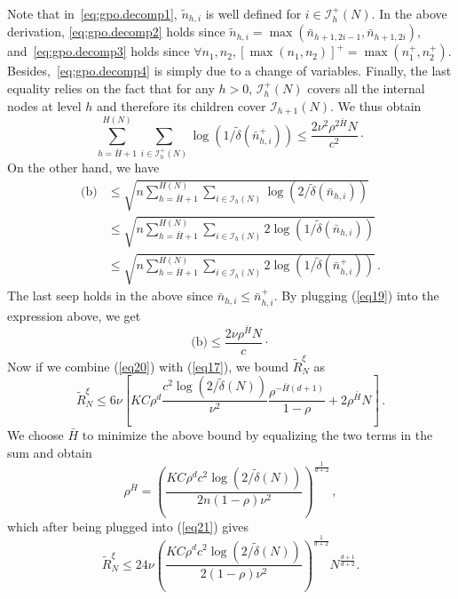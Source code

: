 \endgroup
Note that in~\eqref{eq:gpo.decomp1}, $\tilde{n}_{h,i}$ is well defined for $i\in\mathcal{I}_h^+(N)$. In the above derivation, \eqref{eq:gpo.decomp2} holds since $\tilde{n}_{h,i}=\max(\bar{n}_{h+1,2i-1},\bar{n}_{h+1,2i})$, and~\eqref{eq:gpo.decomp3} holds since $\forall n_1,n_2,\left[\max(n_1,n_2)\right]^+=\max(n_1^+,n_2^+)$. Besides,~\eqref{eq:gpo.decomp4} is simply due to a change of variables. Finally, the last equality relies on the fact that for any $h>0$, $\mathcal{I}_h^+(N)$ covers all the internal nodes at level $h$ and therefore its children cover $\mathcal{I}_{h+1}(N)$. We  thus obtain
\begin{equation} \label{eq19}
\sum_{h=\bar{H}+1}^{H(N)}\sum_{i\in\mathcal{I}_h^+(N)} \log(1/\tilde{\delta}(\bar{n}_{h,i}^+)) \leq \frac{2\nu^2\rho^{2\bar{H}}N}{c^2}\cdot
\end{equation}
On the other hand, we have
\begingroup
\allowdisplaybreaks
\begin{align*}
    \text{(b)} &\leq \sqrt{n\sum_{h=\bar{H}+1}^{H(N)}\sum_{i\in\mathcal{I}_h(N)} \log(2/\tilde{\delta}(\bar{n}_{h,i}))} \\
               &\leq \sqrt{n\sum_{h=\bar{H}+1}^{H(N)}\sum_{i\in\mathcal{I}_h(N)} 2\log(1/\tilde{\delta}(\bar{n}_{h,i}))} \\
               &\leq \sqrt{n\sum_{h=\bar{H}+1}^{H(N)}\sum_{i\in\mathcal{I}_h(N)} 2\log(1/\tilde{\delta}(\bar{n}_{h,i}^+))}\,.
\end{align*}
\endgroup
The last seep holds in the above since $\bar{n}_{h,i}\leq\bar{n}_{h,i}^+$. By plugging (\ref{eq19}) into the expression above, we get
\begin{equation} \label{eq20}
    \text{(b)} \leq \frac{2\nu\rho^{\bar{H}}N}{c}\cdot
\end{equation}
Now if we combine  (\ref{eq20}) with (\ref{eq17}), we  bound  $\tilde{R}_N^{\xi}$ as
\begin{equation} \label{eq21}
    \tilde{R}_N^{\xi} \leq 6\nu\left[KC\rho^d \frac{c^2\log(2/\tilde{\delta}(N))}{\nu^2} \frac{\rho^{-\bar{H}(d+1)}}{1-\rho} + 2\rho^{\bar{H}}N\right]\,.
\end{equation}
We  choose $\bar{H}$ to minimize the above bound by equalizing the two terms in the sum and  obtain
\begin{equation}
    \rho^{\bar{H}} = \left( \frac{KC\rho^dc^2\log(2/\tilde{\delta}(N))}{2n(1-\rho)\nu^2} \right)^{\frac{1}{d+2}}\,,
\end{equation}
which after being plugged into (\ref{eq21}) gives
\begin{equation} \label{eq23}
    \tilde{R}_N^{\xi} \leq 24\nu \left( \frac{KC\rho^dc^2\log(2/\tilde{\delta}(N))}{2(1-\rho)\nu^2} \right)^{\frac{1}{d+2}}N^{\frac{d+1}{d+2}}.
\end{equation}
